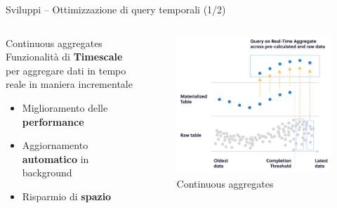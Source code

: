 \begin{frame}{Sviluppi – Ottimizzazione di query temporali (1/2)}

\begin{columns}

\begin{column}{0.45\textwidth}
\begin{block}{Continuous aggregates}
Funzionalità di \textbf{Timescale} per aggregare dati in tempo reale in maniera incrementale

\begin{itemize}
  \item Miglioramento delle \textbf{performance}
  \item Aggiornamento \textbf{automatico} in background
  \item Risparmio di \textbf{spazio}\vspace{0.1cm}
\end{itemize}
\end{block}
\end{column}

\begin{column}{0.55\textwidth}
\begin{figure}[H]
\centering
\captionsetup{justification=centering}
\includegraphics[width=\textwidth]{images/continuous_aggregates_r}
\caption{Continuous aggregates}
\end{figure}
\end{column}

\end{columns}

\end{frame}

